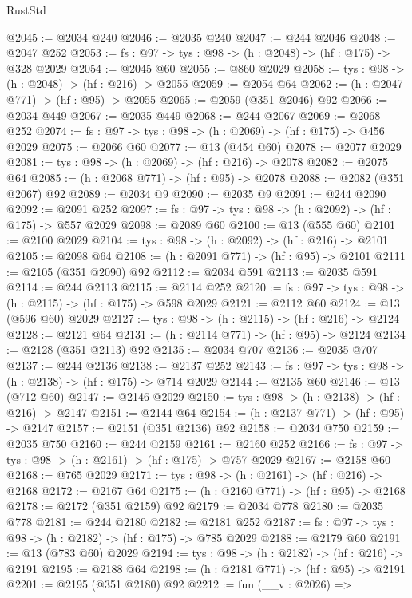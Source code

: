 \begin{lexlean}{RustStd}
\begin{coremodule}
@2045 := @2034 @240
@2046 := @2035 @240
@2047 := @244 @2046
@2048 := @2047 @252
@2053 := {fs : @97} -> {tys : @98} -> (h : @2048) -> (hf : @175) -> @328 @2029
@2054 := @2045 @60
@2055 := @860 @2029
@2058 := {tys : @98} -> (h : @2048) -> (hf : @216) -> @2055
@2059 := @2054 @64
@2062 := (h : @2047 @771) -> (hf : @95) -> @2055
@2065 := @2059 (@351 @2046) @92
@2066 := @2034 @449
@2067 := @2035 @449
@2068 := @244 @2067
@2069 := @2068 @252
@2074 := {fs : @97} -> {tys : @98} -> (h : @2069) -> (hf : @175) -> @456 @2029
@2075 := @2066 @60
@2077 := @13 (@454 @60)
@2078 := @2077 @2029
@2081 := {tys : @98} -> (h : @2069) -> (hf : @216) -> @2078
@2082 := @2075 @64
@2085 := (h : @2068 @771) -> (hf : @95) -> @2078
@2088 := @2082 (@351 @2067) @92
@2089 := @2034 @9
@2090 := @2035 @9
@2091 := @244 @2090
@2092 := @2091 @252
@2097 := {fs : @97} -> {tys : @98} -> (h : @2092) -> (hf : @175) -> @557 @2029
@2098 := @2089 @60
@2100 := @13 (@555 @60)
@2101 := @2100 @2029
@2104 := {tys : @98} -> (h : @2092) -> (hf : @216) -> @2101
@2105 := @2098 @64
@2108 := (h : @2091 @771) -> (hf : @95) -> @2101
@2111 := @2105 (@351 @2090) @92
@2112 := @2034 @591
@2113 := @2035 @591
@2114 := @244 @2113
@2115 := @2114 @252
@2120 := {fs : @97} -> {tys : @98} -> (h : @2115) -> (hf : @175) -> @598 @2029
@2121 := @2112 @60
@2124 := @13 (@596 @60) @2029
@2127 := {tys : @98} -> (h : @2115) -> (hf : @216) -> @2124
@2128 := @2121 @64
@2131 := (h : @2114 @771) -> (hf : @95) -> @2124
@2134 := @2128 (@351 @2113) @92
@2135 := @2034 @707
@2136 := @2035 @707
@2137 := @244 @2136
@2138 := @2137 @252
@2143 := {fs : @97} -> {tys : @98} -> (h : @2138) -> (hf : @175) -> @714 @2029
@2144 := @2135 @60
@2146 := @13 (@712 @60)
@2147 := @2146 @2029
@2150 := {tys : @98} -> (h : @2138) -> (hf : @216) -> @2147
@2151 := @2144 @64
@2154 := (h : @2137 @771) -> (hf : @95) -> @2147
@2157 := @2151 (@351 @2136) @92
@2158 := @2034 @750
@2159 := @2035 @750
@2160 := @244 @2159
@2161 := @2160 @252
@2166 := {fs : @97} -> {tys : @98} -> (h : @2161) -> (hf : @175) -> @757 @2029
@2167 := @2158 @60
@2168 := @765 @2029
@2171 := {tys : @98} -> (h : @2161) -> (hf : @216) -> @2168
@2172 := @2167 @64
@2175 := (h : @2160 @771) -> (hf : @95) -> @2168
@2178 := @2172 (@351 @2159) @92
@2179 := @2034 @778
@2180 := @2035 @778
@2181 := @244 @2180
@2182 := @2181 @252
@2187 := {fs : @97} -> {tys : @98} -> (h : @2182) -> (hf : @175) -> @785 @2029
@2188 := @2179 @60
@2191 := @13 (@783 @60) @2029
@2194 := {tys : @98} -> (h : @2182) -> (hf : @216) -> @2191
@2195 := @2188 @64
@2198 := (h : @2181 @771) -> (hf : @95) -> @2191
@2201 := @2195 (@351 @2180) @92
@2212 := fun (__v : @2026) =>

\end{coremodule}
\end{lexlean}
